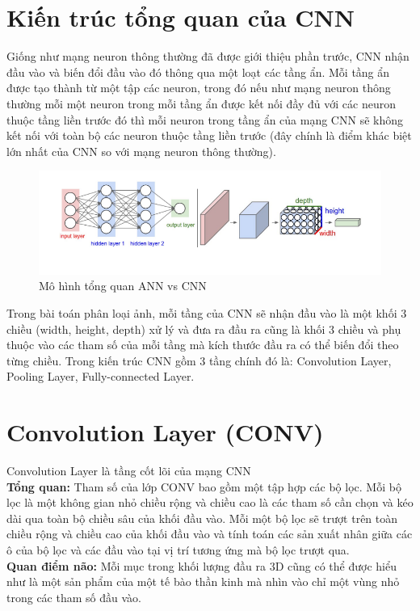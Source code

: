 \documentclass[a4paper,12pt]{report}
\begin{document}
\section{Kiến trúc tổng quan của CNN}\label{sec_intro_cnn}
Giống như mạng neuron thông thường đã được giới thiệu phần trước, CNN nhận đầu vào và biến đổi đầu vào đó thông qua một loạt các tầng ẩn. Mỗi tầng ẩn được tạo thành từ một tập các neuron, trong đó nếu như mạng neuron thông thường mỗi một neuron trong mỗi tầng ẩn được kết nối đầy đủ với các neuron thuộc tầng liền trước đó thì mỗi neuron trong tầng ẩn của mạng CNN sẽ không kết nối với toàn bộ các neuron thuộc tầng liền trước (đây chính là điểm khác biệt lớn nhất của CNN so với mạng neuron thông thường).
\begin{figure}[H]
\includegraphics[scale=0.7]{img1.png}
\caption{Mô hình tổng quan ANN vs CNN}
\end{figure}
Trong bài toán phân loại ảnh, mỗi tầng của CNN sẽ nhận đầu vào là một khối 3 chiều (width, height, depth) xử lý và đưa ra đầu ra cũng là khối 3 chiều và phụ thuộc vào các tham số của mỗi tầng mà kích thước đầu ra có thể biến đổi theo từng chiều. Trong kiến trúc CNN gồm 3 tầng chính đó là: Convolution Layer, Pooling Layer, Fully-connected Layer.

\section{Convolution Layer (CONV)}\label{sec_intro_conv}
Convolution Layer là tầng cốt lõi của mạng CNN \\ 

\textbf{Tổng quan:} Tham số của lớp CONV bao gồm một tập hợp các bộ lọc. Mỗi bộ lọc là một không gian nhỏ chiều rộng và chiều cao là các tham số cần chọn và kéo dài qua toàn bộ chiều sâu của khối đầu vào. Mỗi một bộ lọc sẽ trượt trên toàn chiều rộng và chiều cao của khối đầu vào và tính toán các sản xuất nhân giữa các ô của bộ lọc và các đầu vào tại vị trí tương ứng mà bộ lọc trượt qua. \\ 

\textbf{Quan điểm não:}  Mỗi mục trong khối lượng đầu ra 3D cũng có thể được hiểu như là một sản phẩm của một tế bào thần kinh mà nhìn vào chỉ một vùng nhỏ trong các tham số đầu vào. \\ 
 
\end{document}
